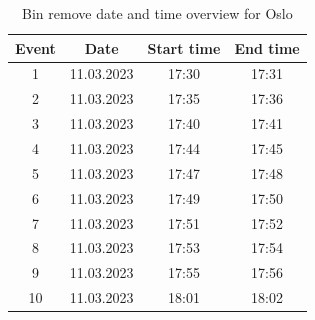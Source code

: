 \begin{table}[H]
\centering
\caption{Bin remove date and time overview for Oslo}
\label{tab:BR_dateandtimeOslo}
\begin{tabular}{|c|c|c|c|}
\hline
\textbf{Event} & \textbf{Date} & \textbf{Start time} & \textbf{End time} \\ \hline
1              & 11.03.2023    & 17:30               & 17:31             \\ \hline
2              & 11.03.2023    & 17:35               & 17:36             \\ \hline
3              & 11.03.2023    & 17:40               & 17:41             \\ \hline
4              & 11.03.2023    & 17:44               & 17:45             \\ \hline
5              & 11.03.2023    & 17:47               & 17:48             \\ \hline
6              & 11.03.2023    & 17:49               & 17:50             \\ \hline
7              & 11.03.2023    & 17:51               & 17:52             \\ \hline
8              & 11.03.2023    & 17:53               & 17:54             \\ \hline
9              & 11.03.2023    & 17:55               & 17:56             \\ \hline
10             & 11.03.2023    & 18:01               & 18:02             \\ \hline
\end{tabular}
\end{table}

